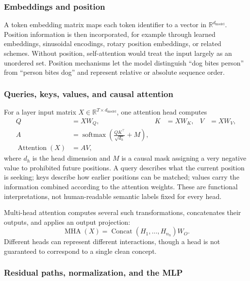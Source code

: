 \documentclass[11pt,a4paper]{article}
\begin{document}
\subsubsection{Embeddings and position}

A token embedding matrix maps each token identifier to a vector in $\mathbb{R}^{d_{\text{model}}}$. Position information is then incorporated, for example through learned embeddings, sinusoidal encodings, rotary position embeddings, or related schemes. Without position, self-attention would treat the input largely as an unordered set. Position mechanisms let the model distinguish ``dog bites person'' from ``person bites dog'' and represent relative or absolute sequence order.

\subsubsection{Queries, keys, values, and causal attention}

For a layer input matrix $X\in\mathbb{R}^{T\times d_{\text{model}}}$, one attention head computes
\begin{align}
Q &= XW_Q, & K &= XW_K, & V &= XW_V,\\
A &= \operatorname{softmax}\left(\frac{QK^{\top}}{\sqrt{d_h}} + M\right),\\
\operatorname{Attention}(X) &= AV,
\end{align}
where $d_h$ is the head dimension and $M$ is a causal mask assigning a very negative value to prohibited future positions. A query describes what the current position is seeking; keys describe how earlier positions can be matched; values carry the information combined according to the attention weights. These are functional interpretations, not human-readable semantic labels fixed for every head.

Multi-head attention computes several such transformations, concatenates their outputs, and applies an output projection:
\begin{equation}
\operatorname{MHA}(X)=\operatorname{Concat}(H_1,\ldots,H_{n_h})W_O.
\end{equation}
Different heads can represent different interactions, though a head is not guaranteed to correspond to a single clean concept.

\subsubsection{Residual paths, normalization, and the MLP}
\end{document}
